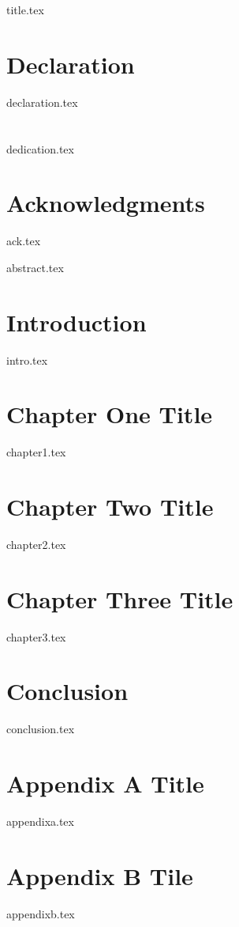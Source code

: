 \documentclass[12pt, oneside]{book}
\begin{document}
{title.tex}

\onehalfspacing
\frontmatter
\chapter*{Declaration}
{declaration.tex}


\chapter*{}
{dedication.tex}
\restoregeometry

\chapter*{Acknowledgments}
{ack.tex}

\singlespacing
\renewcommand*\contentsname{Table of Contents}

\tableofcontents

\listoffigures

\listoftables

\printglossary[type=\acronymtype,title=List of Abbreviation, toctitle=List of Abbreviation,nonumberlist]

\newpage
{abstract.tex}

\newpage

\doublespacing
\mainmatter

\chapter{Introduction}
{intro.tex}
\chapter{Chapter One Title}
{chapter1.tex}
\chapter{Chapter Two Title}
{chapter2.tex}
\chapter{Chapter Three Title}
{chapter3.tex}
\chapter{Conclusion}
{conclusion.tex}

\appendix
\chapter{Appendix A Title}
{appendixa.tex}

\chapter{Appendix B Tile}
{appendixb.tex}

\clearpage
\printbibliography

\clearpage
\end{document}
